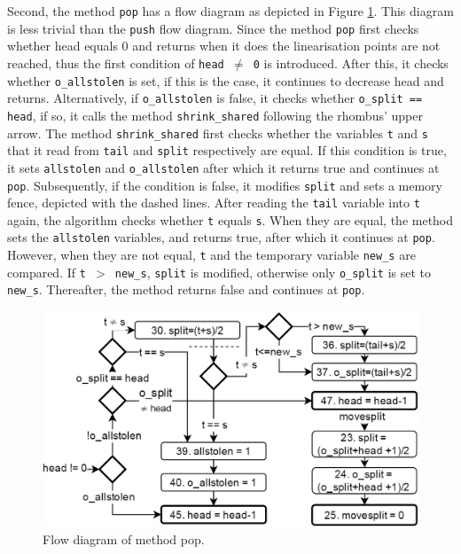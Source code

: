 \documentclass{sig-alternate-br}
\begin{document}
Second, the method \texttt{pop} has a flow diagram as depicted in Figure \ref{fig:pop}.
This diagram is less trivial than the \texttt{push} flow diagram.
Since the method \texttt{pop} first checks whether head equals 0 and returns when it does the linearisation points are not reached, thus the first condition of \texttt{head $\neq$ 0} is introduced.
After this, it checks whether \texttt{o\_allstolen} is set, if this is the case, it continues to decrease head and returns.
Alternatively, if \texttt{o\_allstolen} is false, it checks whether \texttt{o\_split == head}, if so, it calls the method \texttt{shrink\_shared} following the rhombus' upper arrow.
The method \texttt{shrink\_shared} first checks whether the variables \texttt{t} and \texttt{s} that it read from \texttt{tail} and \texttt{split} respectively are equal.
If this condition is true, it sets \texttt{allstolen} and \texttt{o\_allstolen} after which it returns true and continues at \texttt{pop}.
Subsequently, if the condition is false, it modifies \texttt{split} and sets a memory fence, depicted with the dashed lines.
After reading the \texttt{tail} variable into \texttt{t} again, the algorithm checks whether \texttt{t} equals \texttt{s}.
When they are equal, the method sets the \texttt{allstolen} variables, and returns true, after which it continues at \texttt{pop}.
However, when they are not equal, \texttt{t} and the temporary variable \texttt{new\_s} are compared.
If \texttt{t $>$ new\_s}, \texttt{split} is modified, otherwise only \texttt{o\_split} is set to \texttt{new\_s}.
Thereafter, the method returns false and continues at \texttt{pop}.
\begin{figure}[h]
	\centering
	\includegraphics[scale=0.25]{Pop_flow_diagram_2.png}
	\caption{Flow diagram of method pop.}
	\label{fig:pop}
\end{figure}
\end{document}
